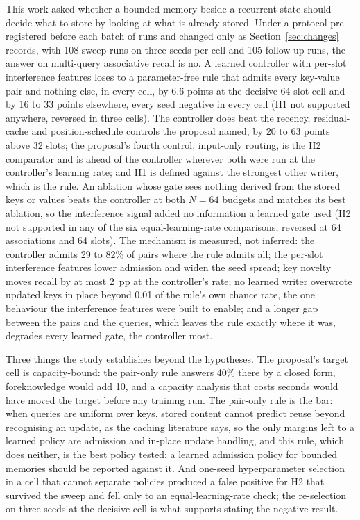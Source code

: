 \documentclass[conference]{IEEEtran}
\begin{document}
This work asked whether a bounded memory beside a recurrent state should
decide what to store by looking at what is already stored. Under a protocol
pre-registered before each batch of runs and changed only as
Section~\ref{sec:changes} records, with 108 sweep runs on three seeds per
cell and 105 follow-up runs, the answer on multi-query associative recall is
no. A learned
controller with per-slot interference features loses to a parameter-free rule
that admits every key-value pair and nothing else, in every cell, by 6.6
points at the decisive 64-slot cell and by 16 to 33 points elsewhere, every
seed negative in every cell (H1 not supported anywhere, reversed in three
cells). The controller does beat the recency, residual-cache and
position-schedule controls the proposal named, by 20 to 63 points above 32
slots; the proposal's fourth control, input-only routing, is the H2
comparator and is ahead of the controller wherever both were run at the
controller's learning rate; and H1 is defined against the strongest other
writer, which is the rule. An ablation whose gate sees nothing
derived from the stored keys or values beats the controller at both $N = 64$
budgets and matches its best ablation, so the interference signal added no
information a learned gate used (H2 not supported in any of the six
equal-learning-rate comparisons, reversed at 64 associations and 64 slots).
The mechanism is measured, not inferred: the controller admits 29 to 82\% of
pairs where the rule admits all; the per-slot interference features lower
admission and widen the seed spread; key novelty moves recall by at most 2~pp
at the controller's rate; no learned writer overwrote updated keys in place
beyond 0.01 of the rule's own chance rate, the one behaviour the interference
features were built to enable; and a longer gap between the pairs and the queries, which leaves the
rule exactly where it was, degrades every learned gate, the controller most.

Three things the study establishes beyond the hypotheses. The proposal's
target cell is capacity-bound: the pair-only rule answers 40\% there by a
closed form, foreknowledge would add 10, and a capacity analysis that costs
seconds would have moved the target before any training run. The pair-only
rule is the bar: when queries are uniform over keys, stored content cannot
predict reuse beyond recognising an update, as the caching literature says,
so the only margins left to a learned policy are admission and in-place update
handling, and this rule, which does neither, is the best policy tested; a
learned admission policy for bounded memories should be reported against it. And one-seed hyperparameter selection in a cell that
cannot separate policies produced a false positive for H2 that survived the
sweep and fell only to an equal-learning-rate check; the re-selection on three
seeds at the decisive cell is what supports stating the negative result.
\end{document}

